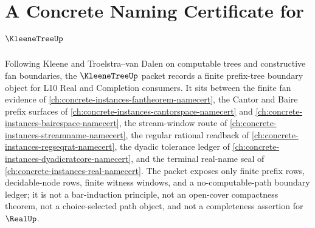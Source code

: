 \chapter{A Concrete Naming Certificate for $\KleeneTreeUp$}
\label{ch:concrete-instances-kleene-tree-namecert}

Following Kleene and Troelstra--van Dalen on computable trees and constructive fan boundaries, the $\KleeneTreeUp$ packet records a finite prefix-tree boundary object for L10 Real and Completion consumers. It sits between the finite fan evidence of \autoref{ch:concrete-instances-fantheorem-namecert}, the Cantor and Baire prefix surfaces of \autoref{ch:concrete-instances-cantorspace-namecert} and \autoref{ch:concrete-instances-bairespace-namecert}, the stream-window route of \autoref{ch:concrete-instances-streamname-namecert}, the regular rational readback of \autoref{ch:concrete-instances-regseqrat-namecert}, the dyadic tolerance ledger of \autoref{ch:concrete-instances-dyadicratcore-namecert}, and the terminal real-name seal of \autoref{ch:concrete-instances-real-namecert}. The packet exposes only finite prefix rows, decidable-node rows, finite witness windows, and a no-computable-path boundary ledger; it is not a bar-induction principle, not an open-cover compactness theorem, not a choice-selected path object, and not a completeness assertion for $\RealUp$.

